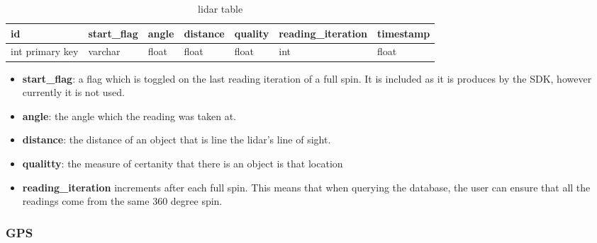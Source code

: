 \begin{table}[!htb]
\centering
\caption{lidar table}
\label{tab:db-lidar}
\begin{tabular}{@{}lllllll@{}}
\toprule
id              & start\_flag & angle & distance & quality & reading\_iteration & timestamp \\ \midrule
int primary key & varchar     & float & float    & float   & int            & float
\end{tabular}
\end{table}
\begin{itemize}
\item{\textbf{start\_flag}}: a flag which is toggled on the last reading iteration of a full spin. It is included as it is produces by the SDK, however currently it is not used.
\item{\textbf{angle}}: the angle which the reading was taken at.
\item{\textbf{distance}}: the distance of an object that is line the lidar's line of sight.
\item{\textbf{qualitty}}: the measure of certanity that there is an object is that location
\item{\textbf{reading\_iteration}} increments after each full spin. This means that when querying the database, the user can ensure that all the readings come from the same 360 degree spin.
\end{itemize}


\subsubsection{GPS}

